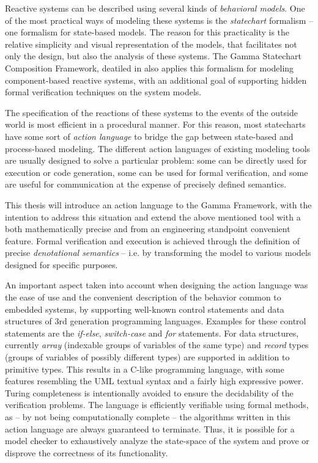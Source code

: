 Reactive systems can be described using several kinds of \textit{behavioral models}. One of the most practical ways of modeling these systems is the \textit{statechart} formalism -- one formalism for state-based models. The reason for this practicality is the relative simplicity and visual representation of the models, that facilitates not only the design, but also the analysis of these systems. The Gamma Statechart Composition Framework, deatiled in \cite{GammaVince2018} also applies this formalism for modeling component-based reactive systems, with an additional goal of supporting hidden formal verification techniques on the system models.

The specification of the reactions of these systems to the events of the outside world is most efficient in a procedural manner. For this reason, most statecharts have some sort of \textit{action language} to bridge the gap between state-based and process-based modeling. The different action languages of existing modeling tools are usually designed to solve a particular problem: some can be directly used for execution or code generation, some can be used for formal verification, and some are useful for communication at the expense of precisely defined semantics. 

This thesis will introduce an action language to the Gamma Framework, with the intention to address this situation and extend the above mentioned tool with a both mathematically precise and from an engineering standpoint convenient feature. Formal verification and execution is achieved through the definition of precise \textit{denotational semantics} -- i.e. by transforming the model to various models designed for specific purposes. 

An important aspect taken into account when designing the action language was the ease of use and the convenient description of the behavior common to embedded systems, by supporting well-known control statements and data structures of 3rd generation programming languages. Examples for these control statements are the \textit{if-else}, \textit{switch-case} and \textit{for} statements. For data structures, currently \textit{array} (indexable groups of variables of the same type) and \textit{record} types (groups of variables of possibly different types) are supported in addition to primitive types. This results in a C-like programming language, with some features resembling the UML textual syntax and a fairly high expressive power. Turing completeness is intentionally avoided to ensure the decidability of the verification problems.
The language is efficiently verifiable using formal methods, as -- by not being computationally complete -- the algorithms written in this action language are always guaranteed to terminate. Thus, it is possible for a model checker to exhaustively analyze the state-space of the system and prove or disprove the correctness of its functionality.

